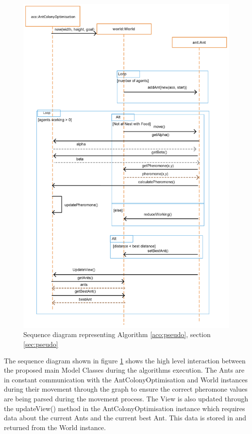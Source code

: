 \clearpage
\begin{figure}
\includegraphics[scale = 0.3]{Images/sequenceRes}
\caption{Sequence diagram representing Algorithm \ref{aco:pseudo}, section \ref{sec:pseudo}}
\label{fig:seq}
\end{figure}
\clearpage

The sequence diagram shown in figure \ref{fig:seq} shows the high level interaction between the proposed main Model Classes during the algorithms execution. The Ants are in constant communication with the AntColonyOptimisation and World instances during their movement through the graph to ensure the correct pheromone values are being parsed during the movement process. The View is also updated through the updateView() method in the AntColonyOptimisation instance which requires data about the current Ants and the current best Ant. This data is stored in and returned from the World instance.

